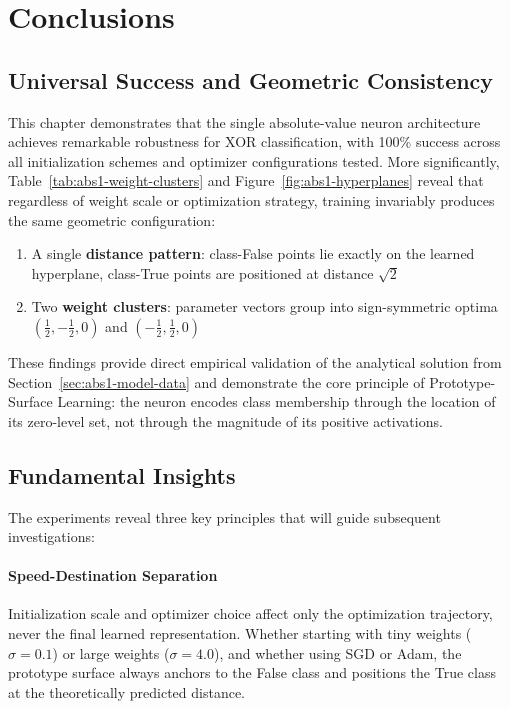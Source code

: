 ﻿\section{Conclusions}
\label{sec:abs1-conclusions}

\subsection*{Universal Success and Geometric Consistency}

This chapter demonstrates that the single absolute-value neuron architecture achieves remarkable robustness for XOR classification, with 100\% success across all initialization schemes and optimizer configurations tested. More significantly, Table~\ref{tab:abs1-weight-clusters} and Figure~\ref{fig:abs1-hyperplanes} reveal that regardless of weight scale or optimization strategy, training invariably produces the same geometric configuration:

\begin{enumerate}[label=(\alph*)]
    \item A single \textbf{distance pattern}: class-False points lie exactly on the learned hyperplane, class-True points are positioned at distance $\sqrt{2}$
    \item Two \textbf{weight clusters}: parameter vectors group into sign-symmetric optima $(\frac{1}{2},-\frac{1}{2},0)$ and $(-\frac{1}{2},\frac{1}{2},0)$
\end{enumerate}

These findings provide direct empirical validation of the analytical solution from Section~\ref{sec:abs1-model-data} and demonstrate the core principle of Prototype-Surface Learning: the neuron encodes class membership through the location of its zero-level set, not through the magnitude of its positive activations.

\subsection*{Fundamental Insights}

The experiments reveal three key principles that will guide subsequent investigations:

\paragraph{Speed-Destination Separation}
Initialization scale and optimizer choice affect only the optimization trajectory, never the final learned representation. Whether starting with tiny weights ($\sigma=0.1$) or large weights ($\sigma=4.0$), and whether using SGD or Adam, the prototype surface always anchors to the False class and positions the True class at the theoretically predicted distance.

